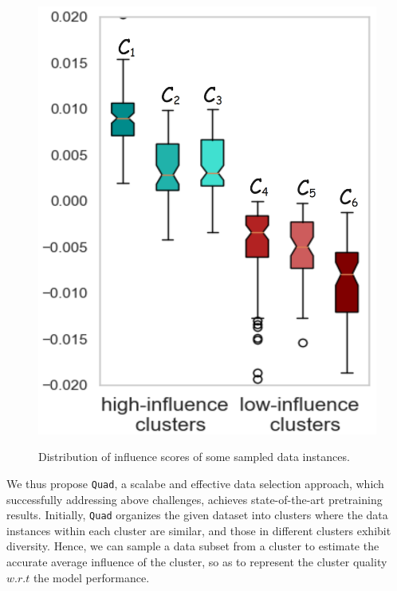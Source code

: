 \documentclass{article} %
\begin{document}
\begin{figure}
\begin{minipage}[h]{0.5\linewidth}
    \includegraphics[scale=0.091]{intro-figure-new2.png}
    \label{fig2}
  \end{minipage}
  \caption{Distribution of influence scores of some sampled data instances.}
  \label{fig:cluster_analysis}
\end{figure}

We thus propose \texttt{Quad}, a scalabe and effective data selection approach, which successfully addressing above challenges, achieves state-of-the-art pretraining results. Initially, \texttt{Quad} organizes the given dataset into clusters where the data instances within each cluster are similar, and those in different clusters exhibit diversity. Hence, we can sample a data subset from a cluster to estimate the accurate average influence of the cluster, so as to represent the cluster quality $w.r.t$ the model performance. %
\end{document}
